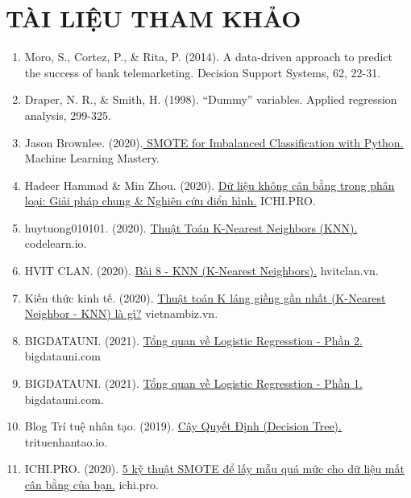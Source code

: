 \documentclass{report}
\begin{document}
\chapter{TÀI LIỆU THAM KHẢO}
        \fontsize{13}{14}\selectfont
        \begin{enumerate}
            \item Moro, S., Cortez, P., \& Rita, P. (2014). A data-driven approach to predict the success of bank telemarketing. Decision Support Systems, 62, 22-31.
            \item Draper, N. R., \& Smith, H. (1998). “Dummy” variables. Applied regression analysis, 299-325.
            \item Jason Brownlee. (2020).\href {https://machinelearningmastery.com/smote-oversampling-for-imbalanced-classification/}{ SMOTE for Imbalanced Classification with Python.} Machine Learning Mastery.
            \item Hadeer Hammad \& Min Zhou. (2020). \href {https://ichi.pro/vi/du-lieu-khong-can-bang-trong-phan-loai-giai-phap-chung-nghien-cuu-dien-hinh-24872928981015}{Dữ liệu không cân bằng trong phân loại: Giải pháp chung \& Nghiên cứu điển hình.} ICHI.PRO.
            \item huytuong010101. (2020). \href {https://codelearn.io/sharing/thuat-toan-k-nearest-neighbors-knn}{Thuật Toán K-Nearest Neighbors (KNN).} codelearn.io.
            \item HVIT CLAN. (2020). \href{https://hvitclan.vn/blog/bai-8-knn-k-nearest-neighbors-194}{Bài 8 - KNN (K-Nearest Neighbors).} hvitclan.vn.
            \item Kiến thức kinh tế. (2020). \href {https://vietnambiz.vn/thuat-toan-k-lang-gieng-gan-nhat-k-nearest-neighbor-knn-la-gi-2020022911113334.htm}{Thuật toán K láng giềng gần nhất (K-Nearest Neighbor - KNN) là gì?} vietnambiz.vn.
            \item BIGDATAUNI. (2021). \href {https://bigdatauni.com/tin-tuc/tong-quan-ve-logistic-regression-hoi-quy-logistic-phan-2.html}{Tổng quan về Logistic Regresstion - Phần 2.} bigdatauni.com
            \item BIGDATAUNI. (2021). \href {https://bigdatauni.com/tin-tuc/tong-quan-ve-logistic-regression-hoi-quy-logistic-phan-1.html}{Tổng quan về Logistic Regresstion - Phần 1.} bigdatauni.com.
            \item Blog Trí tuệ nhân tạo. (2019). \href{https://trituenhantao.io/kien-thuc/decision-tree/}{Cây Quyết Định (Decision Tree).} trituenhantao.io.
            \item ICHI.PRO. (2020). \href {https://ichi.pro/vi/5-ky-thuat-smote-de-lay-mau-qua-muc-cho-du-lieu-mat-can-bang-cua-ban-202401874961077}{5 kỹ thuật SMOTE để lấy mẫu quá mức cho dữ liệu mất cân bằng của bạn.} ichi.pro.

\end{enumerate}
\end{document}
